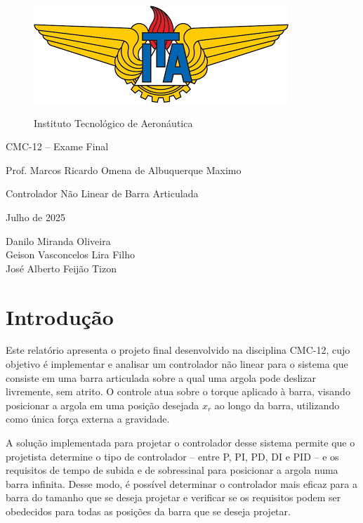 \documentclass[a4paper, 12pt]{article}
\begin{document}
 
\thispagestyle{empty} 
\vspace*{2.15cm}

\begin{figure}[htb]
    \centering
    \includegraphics[scale=0.52]{images/ITA.png}
    
    \large Instituto Tecnológico de Aeronáutica
\end{figure}

\begin{center}
    \huge{CMC-12 – Exame Final} 
    
    \vspace{.5cm}
    \large Prof. Marcos Ricardo Omena de Albuquerque Maximo
    
    \vspace{1cm}
    \Huge Controlador Não Linear de Barra Articulada
    
    \vspace{.5cm}
    \Large Julho de 2025
    
    \vspace{.15cm}
    \large
    Danilo Miranda Oliveira \\
    Geison Vasconcelos Lira Filho \\
    José Alberto Feijão Tizon \\
\end{center}

\newpage
\setcounter{page}{1}


\section{Introdução}

Este relatório apresenta o projeto final desenvolvido na disciplina CMC-12, cujo objetivo é implementar e analisar um controlador não linear para o sistema que consiste em uma barra articulada sobre a qual uma argola pode deslizar livremente, sem atrito. O controle atua sobre o torque aplicado à barra, visando posicionar a argola em uma posição desejada \( x_r \) ao longo da barra, utilizando como única força externa a gravidade.

A solução implementada para projetar o controlador desse sistema permite que o projetista determine o tipo de controlador -- entre P, PI, PD, DI e PID -- e os requisitos de tempo de subida e de sobressinal para posicionar a argola numa barra infinita. Desse modo, é possível determinar o controlador mais eficaz para a barra do tamanho que se deseja projetar e verificar se os requisitos podem ser obedecidos para todas as posições da barra que se deseja projetar.
\end{document}
